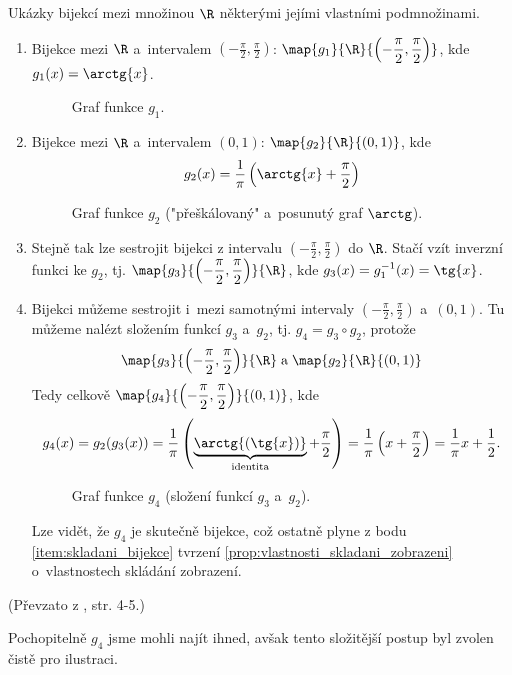 \begin{example}\label{ex:bijekce_realna_cisla}
    Ukázky bijekcí mezi množinou $\R$ některými jejími vlastními podmnožinami.
    \begin{enumerate}[label=(\roman*)]
        \item\label{item:funkce_arctg} Bijekce mezi $\R$ a~intervalem $\displaystyle\left(-\frac{\pi}{2},\frac{\pi}{2}\right)$: $\displaystyle\map{g_1}{\R}{\left(-\frac{\pi}{2},\frac{\pi}{2}\right)}$, kde $g_1(x)=\arctg{x}$.
        \begin{figure}[H]
            \centering
            
            \caption{Graf funkce $g_1$.}
            \label{fig:graf_g1}
        \end{figure}
        \item\label{item:bijekce_0_a_1} Bijekce mezi $\R$ a~intervalem $(0,1)$: $\map{g_2}{\R}{(0,1)}$, kde
        \begin{equation*}
            g_2(x)=\frac{1}{\pi}\left(\arctg{x}+\frac{\pi}{2}\right)
        \end{equation*}
        \begin{figure}[H]
            \centering
            
            \caption{Graf funkce $g_2$ ("přeškálovaný" a~posunutý graf $\arctg$).}
            \label{fig:graf_g2}
        \end{figure}
        \item\label{item:funkce_tg} Stejně tak lze sestrojit bijekci z intervalu $\displaystyle\left(-\frac{\pi}{2},\frac{\pi}{2}\right)$ do $\R$. Stačí vzít inverzní funkci ke $g_2$, tj. $\displaystyle\map{g_3}{\left(-\frac{\pi}{2},\frac{\pi}{2}\right)}{\R}$, kde $g_3(x)=g_1^{-1}(x)=\tg{x}$.
        \item\label{item:bijekce_slozena} Bijekci můžeme sestrojit i~mezi samotnými intervaly $\displaystyle\left(-\frac{\pi}{2},\frac{\pi}{2}\right)$ a~$(0,1)$. Tu můžeme nalézt složením funkcí $g_3$ a~$g_2$, tj. $g_4=g_3\circ g_2$, protože
        \begin{equation*}
            \map{g_3}{\left(-\frac{\pi}{2},\frac{\pi}{2}\right)}{\R}\;\text{a}\;\map{g_2}{\R}{(0,1)}
        \end{equation*}
        Tedy celkově $\displaystyle\map{g_4}{\left(-\frac{\pi}{2},\frac{\pi}{2}\right)}{(0,1)}$, kde
        \begin{equation*}
            g_4(x)=g_2(g_3(x))=\frac{1}{\pi}\left(\underbrace{\arctg{(\tg{x})}}_{\text{identita}}+\frac{\pi}{2}\right)=\frac{1}{\pi}\left(x+\frac{\pi}{2}\right)=\frac{1}{\pi}x+\frac{1}{2}.
        \end{equation*}
        \begin{figure}[H]
            \centering
            
            \caption{Graf funkce $g_4$ (složení funkcí $g_3$ a~$g_2$).}
            \label{fig:graf_g4}
        \end{figure}
        Lze vidět, že $g_4$ je skutečně bijekce, což ostatně plyne z bodu \ref{item:skladani_bijekce} tvrzení \ref{prop:vlastnosti_skladani_zobrazeni} o~vlastnostech skládání zobrazení.
    \end{enumerate}
\end{example}
(Převzato z \cite{Rmoutil2022}, str. 4-5.)
\begin{remark}
    Pochopitelně $g_4$ jsme mohli najít ihned, avšak tento složitější postup byl zvolen čistě pro ilustraci.
\end{remark}